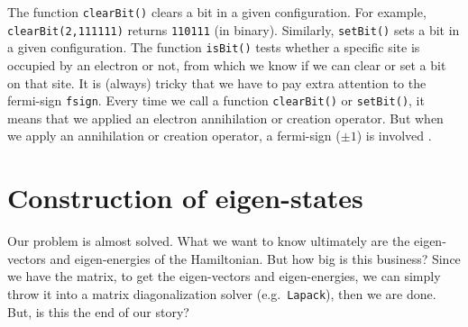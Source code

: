 The function \texttt{clearBit()} clears a bit in a given configuration. For example,
\texttt{clearBit(2,111111)} returns \texttt{110111} (in binary). Similarly,
\texttt{setBit()} sets a bit in a given configuration. The function \texttt{isBit()}
tests whether a specific site is occupied by an electron or not, from which we
know if we can clear or set a bit on that site. It is (always) tricky that
we have to pay extra attention to the fermi-sign \texttt{fsign}. Every time
we call a function \texttt{clearBit()} or \texttt{setBit()}, it means that we applied
an electron annihilation or creation operator. But when we apply an annihilation or
creation operator, a fermi-sign ($\pm1$) is involved \cite{GBK}.

\section{Construction of eigen-states}
Our problem is almost solved.
What we want to know ultimately are the eigen-vectors and eigen-energies
of the Hamiltonian. But how big is this business? Since we have the matrix,
to get the eigen-vectors and eigen-energies, we can simply throw it into a matrix
diagonalization solver (e.g.\ \texttt{Lapack}), then we are done.
But, is this the end of our story?

